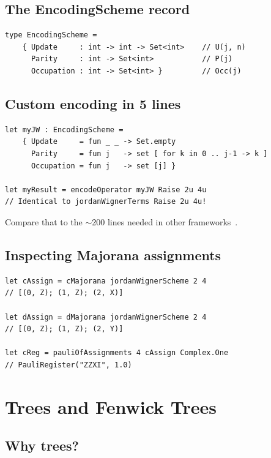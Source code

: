 \documentclass[10pt,a4paper]{article}
\begin{document}
\subsection{The EncodingScheme record}

\begin{lstlisting}
type EncodingScheme =
    { Update     : int -> int -> Set<int>    // U(j, n)
      Parity     : int -> Set<int>           // P(j)
      Occupation : int -> Set<int> }         // Occ(j)
\end{lstlisting}

\subsection{Custom encoding in 5 lines}

\begin{lstlisting}
let myJW : EncodingScheme =
    { Update     = fun _ _ -> Set.empty
      Parity     = fun j   -> set [ for k in 0 .. j-1 -> k ]
      Occupation = fun j   -> set [j] }

let myResult = encodeOperator myJW Raise 2u 4u
// Identical to jordanWignerTerms Raise 2u 4u!
\end{lstlisting}

Compare that to the $\sim$200 lines needed in other
frameworks~\cite{mcclean2020}.

\subsection{Inspecting Majorana assignments}

\begin{lstlisting}
let cAssign = cMajorana jordanWignerScheme 2 4
// [(0, Z); (1, Z); (2, X)]

let dAssign = dMajorana jordanWignerScheme 2 4
// [(0, Z); (1, Z); (2, Y)]

let cReg = pauliOfAssignments 4 cAssign Complex.One
// PauliRegister("ZZXI", 1.0)
\end{lstlisting}


\section{Trees and Fenwick Trees}\label{ch:trees}

\subsection{Why trees?}
\end{document}
